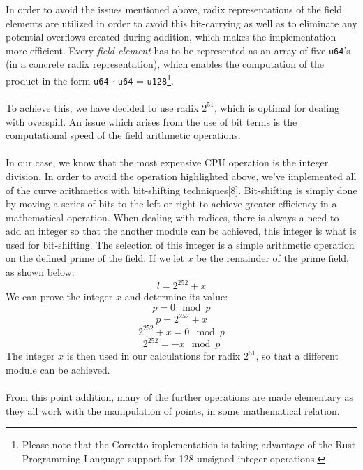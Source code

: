 \documentclass{article}
\begin{document}
In order to avoid the issues mentioned above, radix representations of the field elements are utilized in order to avoid this bit-carrying as well as to eliminate any potential overflows created during addition, which makes the implementation more efficient. Every \textit{field element} has to be represented as an array of five \texttt{u64}'s (in a concrete radix representation), which enables the computation of the product in the form \texttt{u64} $\cdot$ \texttt{u64} = \texttt{u128}\footnote{Please note that the Corretto implementation is taking advantage of the Rust Programming Language support for 128-unsigned integer operations.}.
\\\\
To achieve this, we have decided to use radix $2^{51}$, which is optimal for dealing with overspill. An issue which arises from the use of bit terms is the computational speed of the field arithmetic operations. \\\\
In our case, we know that the most expensive CPU operation is the integer division. In order to avoid the operation highlighted above, we've implemented all of the curve arithmetics with bit-shifting techniques[8]. Bit-shifting is simply done by moving a series of bits to the left or right to achieve greater efficiency in a mathematical operation. When dealing with radices, there is always a need to add an integer so that the another module can be achieved, this integer is what is used for bit-shifting. The selection of this integer is a simple arithmetic operation on the defined prime of the field. 
If we let $x$ be the remainder of the prime field, as shown below:
$$ l = 2^{252}+x $$
We can prove the integer $x$ and determine its value:
$$ p = 0\mod p$$  
$$ p = 2^{252}+x $$
$$ 2^{252}+x = 0\mod p $$
$$ 2^{252} = -x\mod p $$
The integer $x$ is then used in our calculations for radix $2^{51}$, so that a different module can be achieved. \\\\
From this point addition, many of the further operations are made elementary as they all work with the manipulation of points, in some mathematical relation.  


\newpage
\end{document}
